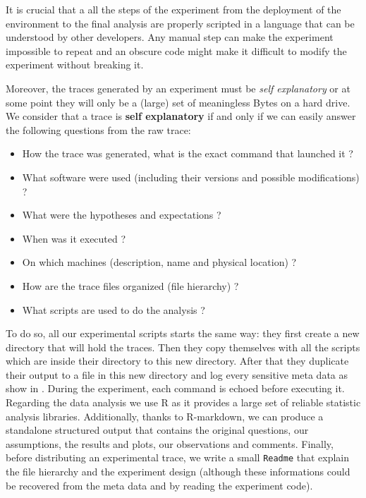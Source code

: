 It is crucial that a all the steps of the experiment from the deployment of the environment to the final analysis are properly scripted in a language that can be understood by other developers.
Any manual step can make the experiment impossible to repeat and an obscure code might make it difficult to modify the experiment without breaking it.

Moreover, the traces generated by an experiment must be \emph{self explanatory} or at some point they will only be a (large) set of meaningless Bytes on a hard drive.
We consider that a trace is \textbf{self explanatory} if and only if we can easily answer the following questions from the raw trace:
\begin{itemize}
    \item How the trace was generated, what is the exact command that launched it ?
    \item What software were used (including their versions and possible modifications) ?
    \item What were the hypotheses and expectations ?
    \item When was it executed ?
    \item On which machines (description, name and physical location) ?
    \item How are the trace files organized (file hierarchy) ?
    \item What scripts are used to do the analysis ?
\end{itemize}
To do so, all our experimental scripts starts the same way: they first create a new directory that will hold the traces.
Then they copy themselves with all the scripts which are inside their directory to this new directory.
After that they duplicate their output to a file in this new directory and log every sensitive meta data as show in .
During the experiment, each command is echoed before executing it.
Regarding the data analysis we use \gls{R} as it provides a large set of reliable statistic analysis libraries.
Additionally, thanks to \gls{R-markdown}, we can produce a standalone structured output that contains the original questions, our assumptions, the results and plots, our observations and comments.
Finally, before distributing an experimental trace, we write a small \texttt{Readme} that explain the file hierarchy and the experiment design (although these informations could be recovered from the meta data and by reading the experiment code).





